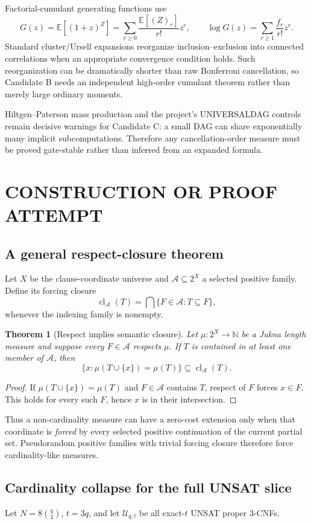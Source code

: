 \documentclass[11pt]{article}
\newtheorem{theorem}{Theorem}
\begin{document}
Factorial-cumulant generating functions use
\[G(z)=\mathbb E[(1+z)^Z]=\sum_{r\ge0}\frac{\mathbb E[(Z)_r]}{r!}z^r,\qquad \log G(z)=\sum_{r\ge1}\frac{f_r}{r!}z^r.\]
Standard cluster/Ursell expansions reorganize inclusion--exclusion into connected correlations when an appropriate convergence condition holds. Such reorganization can be dramatically shorter than raw Bonferroni cancellation, so Candidate B needs an independent high-order cumulant theorem rather than merely large ordinary moments.

Hiltgen--Paterson mass production and the project's UNIVERSALDAG controls remain decisive warnings for Candidate C: a small DAG can share exponentially many implicit subcomputations. Therefore any cancellation-order measure must be proved gate-stable rather than inferred from an expanded formula.

\section{CONSTRUCTION OR PROOF ATTEMPT}
\subsection{A general respect-closure theorem}
Let $X$ be the clause-coordinate universe and $\mathcal A\subseteq2^X$ a selected positive family. Define its forcing closure
\[\operatorname{cl}_{\mathcal A}(T)=\bigcap\{F\in\mathcal A:T\subseteq F\},\]
whenever the indexing family is nonempty.

\begin{theorem}[Respect implies semantic closure]
Let $\mu:2^X\to\mathbb N$ be a Jukna length measure and suppose every $F\in\mathcal A$ respects $\mu$. If $T$ is contained in at least one member of $\mathcal A$, then
\[\{x:\mu(T\cup\{x\})=\mu(T)\}\subseteq\operatorname{cl}_{\mathcal A}(T).\]
\end{theorem}
\begin{proof}
If $\mu(T\cup\{x\})=\mu(T)$ and $F\in\mathcal A$ contains $T$, respect of $F$ forces $x\in F$. This holds for every such $F$, hence $x$ is in their intersection.
\end{proof}

Thus a non-cardinality measure can have a zero-cost extension only when that coordinate is \emph{forced} by every selected positive continuation of the current partial set. Pseudorandom positive families with trivial forcing closure therefore force cardinality-like measures.

\subsection{Cardinality collapse for the full UNSAT slice}
Let $N=8\binom q3$, $t=3q$, and let $\mathcal U_{q,t}$ be all exact-$t$ UNSAT proper 3-CNFs.
\end{document}
